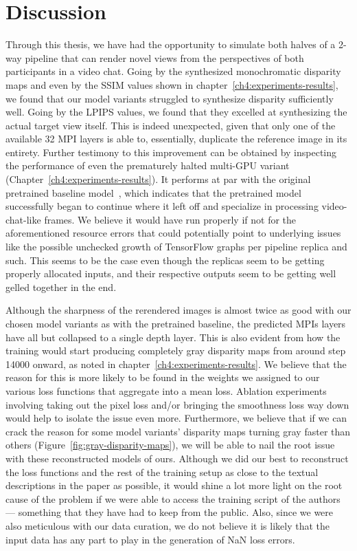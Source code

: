 \chapter{Discussion}\label{ch:discussion}

Through this thesis, we have had the opportunity to simulate both halves of a 2-way pipeline that can render novel views from the perspectives of both participants in a video chat. Going by the synthesized monochromatic disparity maps and even by the SSIM values shown in chapter~\ref{ch4:experiments-results}, we found that our model variants struggled to synthesize disparity sufficiently well. Going by the LPIPS values, we found that they excelled at synthesizing the actual target view itself. This is indeed unexpected, given that only one of the available 32 MPI layers is able to, essentially, duplicate the reference image in its entirety. Further testimony to this improvement can be obtained by inspecting the performance of even the prematurely halted multi-GPU variant (Chapter~\ref{ch4:experiments-results}). It performs at par with the original pretrained baseline model~\cite{single_view_mpi}, which indicates that the pretrained model successfully began to continue where it left off and specialize in processing video-chat-like frames. We believe it would have run properly if not for the aforementioned resource errors that could potentially point to underlying issues like the possible unchecked growth of TensorFlow graphs per pipeline replica and such. This seems to be the case even though the replicas seem to be getting properly allocated inputs, and their respective outputs seem to be getting well gelled together in the end.

Although the sharpness of the rerendered images is almost twice as good with our chosen model variants as with the pretrained baseline, the predicted MPIs layers have all but collapsed to a single depth layer. This is also evident from how the training would start producing completely gray disparity maps from around step 14000 onward, as noted in chapter~\ref{ch4:experiments-results}. We believe that the reason for this is more likely to be found in the weights we assigned to our various loss functions that aggregate into a mean loss. Ablation experiments involving taking out the pixel loss and/or bringing the smoothness loss way down would help to isolate the issue even more. Furthermore, we believe that if we can crack the reason for some model variants' disparity maps turning gray faster than others (Figure~\ref{fig:gray-disparity-maps}), we will be able to nail the root issue with these reconstructed models of ours. Although we did our best to reconstruct the loss functions and the rest of the training setup as close to the textual descriptions in the paper as possible, it would shine a lot more light on the root cause of the problem if we were able to access the training script of the authors --- something that they have had to keep from the public. Also, since we were also meticulous with our data curation, we do not believe it is likely that the input data has any part to play in the generation of NaN loss errors.

